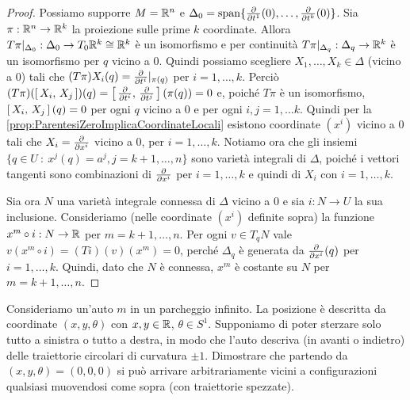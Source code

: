 \begin{proof}
	Possiamo supporre $M=\mathbb R^n$ e $\Delta_0=\mathrm{span}\{\frac{\partial }{\partial t^1}(0),\ldots,\frac{\partial }{\partial t^k}(0)\}$. Sia $\pi:\mathbb R^n\to\mathbb R^k$ la proiezione sulle prime $k$ coordinate. Allora $T\pi|_{\Delta_0}:\Delta_0\to T_0\mathbb R^k\cong \mathbb R^k$ è un isomorfismo e per continuità $T\pi|_{\Delta_q}:\Delta_q\to\mathbb R^k $ è un isomorfismo per $q$ vicino a 0.
	Quindi possiamo scegliere $X_1,\ldots,X_k\in\Delta$ (vicino a 0) tali che $(T\pi)X_i(q) = \frac{\partial }{\partial t^i}|_{\pi(q)}$ per $i=1,\ldots, k$.
	Perciò $(T\pi)(\left[\,X_i,\,X_j\,\right])(q) = \left[\,\frac{\partial }{\partial t^i},\,\frac{\partial }{\partial t^j}\,\right](\pi(q))=0$ e, poiché $T\pi$ è un isomorfismo, $\left[\,X_i,\,X_j\,\right](q)=0$ per ogni $q$ vicino a 0 e per ogni $i,j=1,...k$.
	Quindi per la \cref{prop:ParentesiZeroImplicaCoordinateLocali} esistono coordinate $(x^i)$ vicino a 0 tali che $X_i = \frac{\partial }{\partial x^i}$ vicino a 0, per $i=1,\ldots,k$.
	Notiamo ora che gli insiemi $\{q\in U\ : \ x^j(q)=a^j, j=k+1,\ldots,n\}$ sono varietà integrali di $\Delta$, poiché i vettori tangenti sono combinazioni di $\frac{\partial }{\partial x^i}$ per $i=1,\ldots,k$ e quindi di $X_i$ con $i=1,\ldots,k$.
	
	Sia ora $N$ una varietà integrale connessa di $\Delta$ vicino a 0 e sia $i:N\to U$ la sua inclusione. Consideriamo (nelle coordinate $(x^i)$ definite sopra) la funzione $x^m\circ i:N\to \mathbb R$ per $m=k+1,\ldots,n$. Per ogni $v\in T_qN$ vale $v(x^m\circ i) = (T i)(v)(x^m)=0$, perché $\Delta_q$ è generata da $\frac{\partial }{\partial x^i}(q)$ per $i=1,\ldots,k$. Quindi, dato che $N$ è connessa, $x^m$ è costante su $N$ per $m=k+1,\ldots,n$.
\end{proof}

\begin{exercise} [Parcheggio]
	Consideriamo un'auto $m$ in un parcheggio infinito. La posizione è descritta da coordinate $(x,y,\theta)$ con $x,y\in\mathbb R$, $\theta\in S^1$.
	Supponiamo di poter sterzare solo tutto a sinistra o tutto a destra, in modo che l'auto descriva (in avanti o indietro) delle traiettorie circolari di curvatura $\pm 1$.
	Dimostrare che partendo da $(x,y,\theta)=(0,0,0)$ si può arrivare arbitrariamente vicini a configurazioni qualsiasi muovendosi come sopra (con traiettorie spezzate).
\end{exercise}


